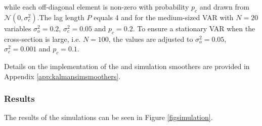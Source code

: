 \documentclass[notitlepage,a4paper,12pt]{article}
\begin{document}
\noindent while each off-diagonal element is non-zero with probability $p_c$ and drawn from $\mathcal{N}(0, \sigma^2_c)$.The lag length $P$ equals 4 and for the medium-sized VAR with $N=20$ variables $\sigma^2_o = 0.2 $, $\sigma^2_c = 0.05$ and $p_c = 0.2$. To ensure a stationary VAR when the cross-section is large, i.e. $N=100$, the values are adjusted to $\sigma^2_o = 0.05 $, $\sigma^2_c = 0.001$ and $p_c = 0.1$.

Details on the implementation of the \citet{carterkohn1994_biomtr} and \citet{durbinkoopman2002_biomtr} simulation smoothers are provided in Appendix \ref{app:kalmansimsmoothers}.\\

\subsubsection{Results}

The results of the simulations can be seen in Figure \ref{figsimulation}. 
\end{document}
